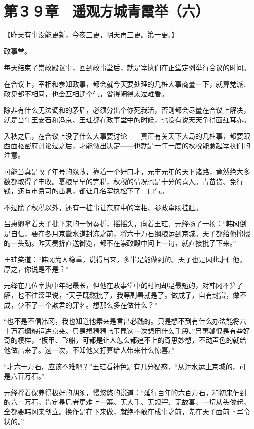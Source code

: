 \section{第３９章　遥观方城青霞举（六）}

【昨天有事没能更新，今夜三更，明天再三更。第一更。】

政事堂。

每天结束了崇政殿议事，回到政事堂后，就是宰执们在正堂定例举行合议的时间。

在合议上，宰相和参知政事，都会就今天要处理的几桩大事商量一下，就算党派、政见都不相同，也会互相通个气，省得闹得太过难看。

除非有什么无法调和的矛盾，必须分出个你死我活，否则都会尽量在合议上解决，就是当年王安石和冯京、王珪都在政事堂中的时候，也没有说天天争得面红耳赤。

入秋之后，在合议上没了什么大事要讨论——真正有关天下大局的几桩事，都要跟西面枢密府讨论过之后，才能做出决定——也就是一年一度的秋税能惹起宰执们的注意。

可能当真是改了年号的缘故，靠着一个好口才，元丰元年的天下诸路，竟然绝大多数都取得了丰收。夏粮早早的完税，秋税的情况也是十分的喜人。青苗贷、免行钱，还有市易司的出息，都让几名宰执松下了一口气。

不过除了秋税以外，还有一桩事让东府中的宰相、参政牵肠挂肚。

吕惠卿拿着天子批下来的一份奏折，摇摇头，向着王珪、元绛扬了一扬：“韩冈倒是自信，要在冬月京畿水道封冻之前，将六十万石纲粮运到京城。天子都给他撺掇的一头劲。昨天奏折直送御览，都不在崇政殿中问上一句，就直接批了下来。”

王珪笑道：“韩冈为人稳重，说得出来，多半是能做到的。天子也是因此才信他。厚之，你说是不是？”

元绛在几位宰执中年纪最长，但他在政事堂中的时间却是最短的，对韩冈不算了解，也不往深里说，“天子既然批了，我等副署就是了。做成了，自有封赏，做不成，少不了一个欺君的罪名。想那么多在做什么？”

“也不是不信韩冈，我也知道他素来是言出必践的。只是想不到有什么办法能将六十万石纲粮运进京来。只是想猜猜韩玉昆这一次想用什么手段。”吕惠卿很是有些好奇的模样，“板甲、飞船，可都是让人怎么都追不上的奇思妙想，不动声色的就给他做出来了。这一次，不知他又打算给人带来什么惊喜。”

“才六十万石，应该不难吧？”王珪看神色是有几分疑惑，“从汴水运上京城的，可是六百万石。”

元绛捋着保养得极好的胡须，慢悠悠的说道：“延行百年的六百万石，和初来乍到的六十万石，肯定是后者更难上一筹。无人手、无规程、无故事，一切从头做起，全都要韩冈来创立。换作是在下来做，就绝不敢在成事之前，先在天子面前下军令状的。”

